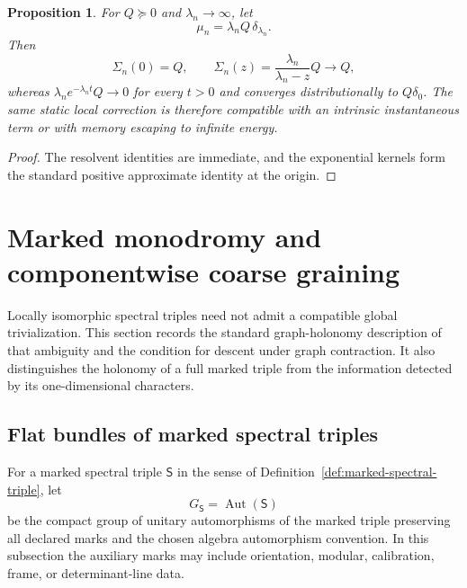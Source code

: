 \documentclass[11pt]{article}
\newtheorem{proposition}[proposition]{Proposition}
\theoremstyle{definition}
\theoremstyle{remark}
\theoremstyle{definition}
\theoremstyle{remark}
\begin{document}
\begin{proposition}
\label{cth:supp-contact-static}
For $Q\succeq0$ and $\lambda_n\to\infty$, let
\[
 \mu_n=\lambda_nQ\,\delta_{\lambda_n}.
\]
Then
\begin{equation}
 {
 \Sigma_n(0)=Q,\qquad
 \Sigma_n(z)=\frac{\lambda_n}{\lambda_n-z}Q\longrightarrow Q,}
 \label{eq:supp-contact-static}
\end{equation}
whereas $\lambda_ne^{-\lambda_nt}Q\to0$ for every $t>0$ and converges
distributionally to $Q\delta_0$.  The same static local correction is
therefore compatible with an intrinsic instantaneous term or with memory escaping to
infinite energy.
\end{proposition}

\begin{proof}
The resolvent identities are immediate, and the exponential kernels form the
standard positive approximate identity at the origin.
\end{proof}

\section{Marked monodromy and componentwise coarse graining}
\label{app:marked-monodromy}

Locally isomorphic spectral triples need not admit a compatible global
trivialization.  This section records the standard graph-holonomy
description of that ambiguity and the condition for descent under graph
contraction.  It also distinguishes the holonomy of a full marked triple
from the information detected by its one-dimensional characters.

\subsection{Flat bundles of marked spectral triples}

For a marked spectral triple $\mathsf S$ in the sense of
Definition~\ref{def:marked-spectral-triple}, let
\begin{equation}
 G_{\mathsf S}=\operatorname{Aut}(\mathsf S)
 \label{eq:supp-marked-aut}
\end{equation}
be the compact group of unitary automorphisms of the marked triple preserving all declared
marks and the chosen algebra automorphism convention.  In this subsection the
auxiliary marks may include orientation, modular, calibration, frame, or
determinant-line data.
\end{document}
